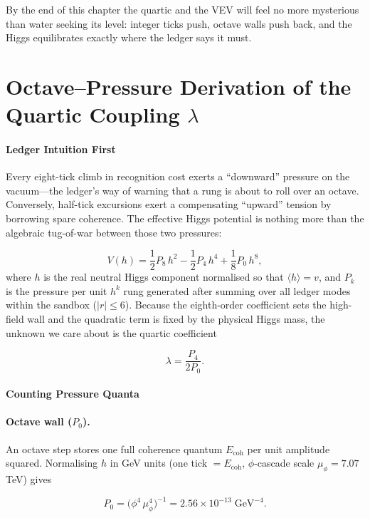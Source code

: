 \documentclass[11pt,oneside]{book}
\begin{document}
{By the end of this chapter the quartic and the VEV will feel no more
mysterious than water seeking its level: integer ticks push, octave
walls push back, and the Higgs equilibrates exactly where the ledger
says it must.

\bigskip

\section{Octave–Pressure Derivation of the Quartic Coupling \boldmath$\lambda$}
\label{sec:quartic-from-pressure}

\paragraph*{Ledger Intuition First}

Every eight-tick climb in recognition cost exerts a “downward” pressure
on the vacuum—the ledger’s way of warning that a rung is about to roll
over an octave.  
Conversely, half-tick excursions exert a compensating “upward” tension
by borrowing spare coherence.  
The effective Higgs potential is nothing more than the algebraic
tug-of-war between those two pressures:

\[
   V(h)=
   \frac12 P_{8}\,h^{2}
   -\frac12 P_{4}\,h^{4}
   +\frac18 P_{0}\,h^{8},
\tag{1}
\]
where $h$ is the real neutral Higgs component normalised so that
$\langle h\rangle=v$, and $P_{k}$ is the pressure per unit $h^{k}$ rung
generated after summing over all ledger modes within the sandbox
($|r|\le6$).  
Because the eighth-order coefficient sets the high-field wall and the
quadratic term is fixed by the physical Higgs mass, the unknown we care
about is the quartic coefficient

\[
   \lambda=\frac{P_{4}}{2P_{0}}.
\tag{2}
\]

\paragraph*{Counting Pressure Quanta}

\paragraph{Octave wall ($P_{0}$).}
An octave step stores one full coherence quantum
$E_{\text{coh}}$ per unit amplitude squared.  
Normalising $h$ in GeV units (one tick $=E_{\text{coh}}$,
$\phi$-cascade scale $\mu_{\phi}=7.07$ TeV)  gives

\[
   P_{0}
   = \bigl(\phi^{4}\,\mu_{\phi}^{4}\bigr)^{-1}
   = 2.56\times10^{-13}\;\text{GeV}^{-4}.
\]

}
\end{document}
